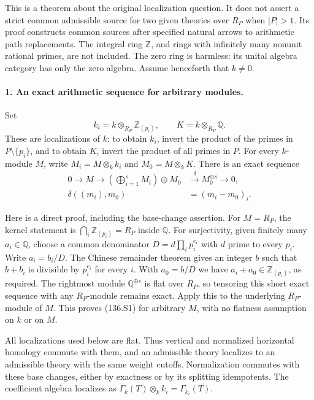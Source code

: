 This is a theorem about the original localization question.
It does not assert a strict common admissible source for two
given theories over $R_P$ when $|P|>1$. Its proof constructs
common sources after specified natural arrows to arithmetic
path replacements. The integral ring $\mathbb Z$, and rings
with infinitely many nonunit rational primes, are not included.
The zero ring is harmless: its unital algebra category has
only the zero algebra. Assume henceforth that $k\ne0$.

\paragraph{1. An exact arithmetic sequence for arbitrary modules.}
Set
\[
 k_i=k\otimes_{R_P}\mathbb Z_{(p_i)},\qquad
 K=k\otimes_{R_P}\mathbb Q.
\]
These are localizations of $k$: to obtain $k_i$, invert the
product of the primes in $P\setminus\{p_i\}$, and to obtain
$K$, invert the product of all primes in $P$.
For every $k$-module $M$, write $M_i=M\otimes_k k_i$ and
$M_0=M\otimes_k K$. There is an exact sequence
\begin{equation}
 \begin{aligned}
 0\longrightarrow M\longrightarrow
       \left(\bigoplus_{i=1}^sM_i\right)\oplus M_0
   &\xrightarrow{\delta} M_0^{\oplus s}\longrightarrow0,\\
 \delta((m_i),m_0)&=(m_i-m_0)_i.
 \end{aligned}                                           \tag{136.S1}
\end{equation}

Here is a direct proof, including the base-change assertion.
For $M=R_P$, the kernel statement is
$\bigcap_i\mathbb Z_{(p_i)}=R_P$ inside $\mathbb Q$.
For surjectivity, given finitely many $a_i\in\mathbb Q$,
choose a common denominator
$D=d\prod_i p_i^{e_i}$ with $d$ prime to every $p_i$.
Write $a_i=b_i/D$. The Chinese remainder theorem gives an
integer $b$ such that $b+b_i$ is divisible by $p_i^{e_i}$
for every $i$. With $a_0=b/D$ we have
$a_i+a_0\in\mathbb Z_{(p_i)}$, as required.
The rightmost module $\mathbb Q^{\oplus s}$ is flat over
$R_P$, so tensoring this short exact sequence with any
$R_P$-module remains exact. Apply this to the underlying
$R_P$-module of $M$. This proves (136.S1) for arbitrary
$M$, with no flatness assumption on $k$ or on $M$.

All localizations used below are flat. Thus vertical and
normalized horizontal homology commute with them, and an
admissible theory localizes to an admissible theory with
the same weight cutoffs. Normalization commutes with these
base changes, either by exactness or by its splitting
idempotents. The coefficient algebra localizes as
$\Gamma_k(T)\otimes_k k_i=\Gamma_{k_i}(T)$.

